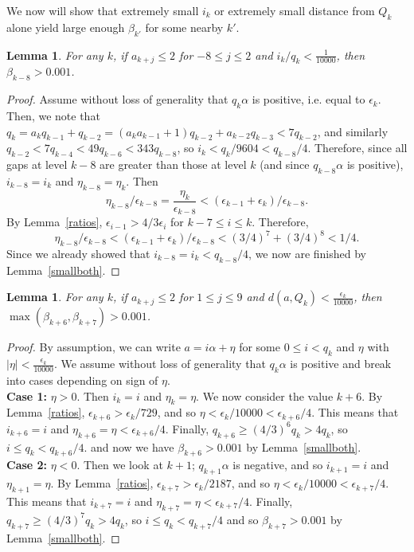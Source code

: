 \documentclass[11pt,reqno]{amsart}
\newtheorem{lemma}[theorem]{Lemma}
\theoremstyle{definition}
\theoremstyle{plain}
\begin{document}
We now will show that extremely small $i_k$ or extremely small distance from $Q_k$ alone yield large enough $\beta_{k'}$ for some nearby $k'$.

\begin{lemma}\label{smalli}
For any $k$, if $a_{k + j} \leq 2$ for $-8 \leq j \leq 2$ and $i_k/q_k < \frac{1}{10000}$, then $\beta_{k-8} > 0.001$.
\end{lemma}

\begin{proof}

Assume without loss of generality that $q_k \alpha$ is positive, i.e. equal to $\epsilon_k$. Then, we note that
$q_k = a_k q_{k-1} + q_{k-2} = (a_k a_{k-1} + 1) q_{k-2} + a_{k-2} q_{k-3} < 7 q_{k-2}$, and similarly
$q_{k-2} < 7q_{k-4} < 49q_{k-6} < 343q_{k-8}$, so $i_k < q_k/9604 < q_{k-8}/4$. Therefore, since all gaps at level $k-8$ are greater than those at level $k$ (and since $q_{k-8} \alpha$ is positive), $i_{k-8} = i_k$ and $\eta_{k-8} = \eta_k$. Then
\[
\eta_{k-8}/\epsilon_{k-8} = \frac{\eta_k}{\epsilon_{k-8}} < (\epsilon_{k-1} + \epsilon_k)/\epsilon_{k-8}.
\] 
By Lemma~\cref{ratios}, $\epsilon_{i-1} > 4/3 \epsilon_i$ for $k-7 \leq i \leq k$. Therefore, 
\[
\eta_{k-8}/\epsilon_{k-8} < (\epsilon_{k-1} + \epsilon_k)/\epsilon_{k-8} < (3/4)^7 + (3/4)^8 < 1/4.
\]
Since we already showed that $i_{k-8} = i_k < q_{k-8}/4$, we now are finished by Lemma~\ref{smallboth}.

\end{proof}

\begin{lemma}\label{smalldist}
For any $k$, if $a_{k + j} \leq 2$ for $1 \leq j \leq 9$ and $d(a, Q_k) < \frac{\epsilon_k}{10000}$, then 
$\max(\beta_{k+6}, \beta_{k+7}) > 0.001$.
\end{lemma}

\begin{proof}
By assumption, we can write $a = i \alpha + \eta$ for some $0 \leq i < q_k$ and $\eta$ with $|\eta| < \frac{\epsilon_k}{10000}$. We assume without loss of generality that $q_k \alpha$ is positive and break into cases depending on sign of $\eta$.\\

\noindent
\textbf{Case 1:} $\eta > 0$. Then $i_k = i$ and $\eta_k = \eta$. We now consider the value $k + 6$. 
By Lemma~\ref{ratios}, $\epsilon_{k+6} > \epsilon_k/729$, and so $\eta < \epsilon_k/10000 < \epsilon_{k+6}/4$. This means that 
$i_{k+6} = i$ and $\eta_{k+6} = \eta < \epsilon_{k+6}/4$. Finally, $q_{k+6} \geq (4/3)^6 q_k > 4q_k$, so $i \leq q_k < q_{k+6}/4$. and now we have $\beta_{k+6} > 0.001$ by Lemma~\ref{smallboth}.\\

\noindent
\textbf{Case 2:} $\eta < 0$. Then we look at $k+1$; $q_{k+1} \alpha$ is negative, and so $i_{k+1} = i$ and $\eta_{k+1} = \eta$. 
By Lemma~\ref{ratios}, $\epsilon_{k+7} > \epsilon_k/2187$, and so $\eta < \epsilon_k/10000 < \epsilon_{k+7}/4$. This means that
$i_{k+7} = i$ and $\eta_{k+7} = \eta < \epsilon_{k+7}/4$. Finally, $q_{k+7} \geq (4/3)^7 q_k > 4q_k$, so $i \leq q_k < q_{k+7}/4$ and so $\beta_{k+7} > 0.001$ by Lemma~\ref{smallboth}.

\end{proof}
\end{document}
